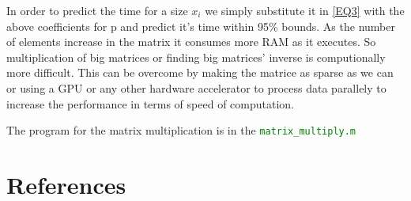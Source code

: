\documentclass[fleqn,letterpaper,12pt]{report}
\begin{document}
In order to predict the time for a size $x_i$ we simply substitute it in \eqref{EQ3} with the above coefficients for p and predict it's time within 95\% bounds. As the number of elements increase in the matrix it consumes more RAM as it executes. So multiplication of big matrices or finding big matrices' inverse is computionally more difficult. This can be overcome by making the matrice as sparse as we can or using a GPU or any other hardware accelerator to process data parallely to increase the performance in terms of speed of computation. 

The program for the matrix multiplication is in the  {\tt{\textcolor{Green}{matrix\_multiply.m}}}
\newpage
{}
\section*{References}


\end{document}
